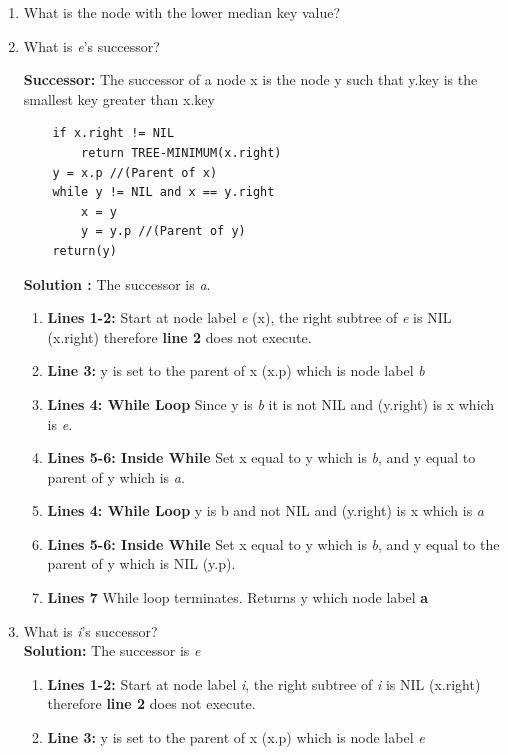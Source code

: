 \documentclass[11pt,fleqn]{book}
\begin{document}
\begin{enumerate}[label=(\Alph*)]
\begin{definition}
    \end{definition}
    \item What is the node with the lower median key value? 
    \item What is \textit{e}'s successor?
    \begin{definition}
    \textbf{Successor: } The successor of a node x is the node y such that y.key  is the smallest key greater than x.key
    \begin{lstlisting}
    if x.right != NIL
        return TREE-MINIMUM(x.right)
    y = x.p //(Parent of x) 
    while y != NIL and x == y.right 
        x = y
        y = y.p //(Parent of y) 
    return(y)
    \end{lstlisting}
    \end{definition}
    \textbf{Solution :} The successor is \textit{a}. 
    \begin{enumerate}
        \item \textbf{Lines 1-2: } Start at node label 
    \textit{e} (x), the right subtree of \textit{e} is NIL (x.right) therefore \textbf{line 2} does not execute.  
        \item \textbf{Line 3: } y is set to the parent of x (x.p)  which is node label \textit{b}
        \item \textbf{Lines 4: While Loop} Since y is \textit{b} it is not NIL and (y.right) is  x which is \textit{e}. 
        \item \textbf{Lines 5-6: Inside While} Set x equal to y which is \textit{b}, and y equal to parent of y which is  \textit{a}. 
        \item \textbf{Lines 4: While Loop} y is b and not NIL and (y.right) is x which is \textit{a}
        \item \textbf{Lines 5-6: Inside While} Set x equal to y which is \textit{b}, and y equal to the parent of y which is NIL (y.p).
        \item \textbf{Lines 7} While loop terminates. Returns y which node label \textbf{a} 
    \end{enumerate}
    \item What is \textit{i}'s successor?\\
    \textbf{Solution: } The successor is \textit{e}
    \begin{enumerate}
        \item \textbf{Lines 1-2:} Start at node label \textit{i}, the right subtree of \textit{i} is NIL (x.right) therefore \textbf{line 2} does not execute. 
        \item \textbf{Line 3:} y is set to the parent of x (x.p) which is node label \textit{e}

\end{enumerate}
\end{enumerate}
\end{document}
